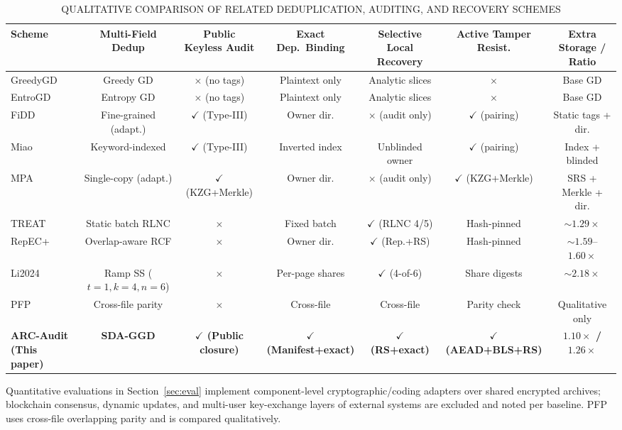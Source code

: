 \documentclass[10pt,journal]{IEEEtran}
\newcommand{\tabnote}[1]{\par\smallskip\parbox{\linewidth}{\footnotesize #1}}
\begin{document}
\begin{table}[t]\centering\scriptsize
\caption{QUALITATIVE COMPARISON OF RELATED DEDUPLICATION, AUDITING, AND RECOVERY SCHEMES}\label{tab:lit-compare}
\setlength{\tabcolsep}{2.8pt}
\begin{tabular}{@{}lcccccc@{}}\toprule
Scheme & Multi-Field Dedup & Public Keyless Audit & Exact Dep.\ Binding & Selective Local Recovery & Active Tamper Resist. & Extra Storage / Ratio\\\midrule
GreedyGD~\cite{Hurst2024GreedyGD} & Greedy GD & $\times$ (no tags) & Plaintext only & Analytic slices & $\times$ & Base GD\\
EntroGD~\cite{Zhao2026EntroGD} & Entropy GD & $\times$ (no tags) & Plaintext only & Analytic slices & $\times$ & Base GD\\
FiDD~\cite{Huang2026FiDD} & Fine-grained (adapt.) & $\checkmark$ (Type-III) & Owner dir. & $\times$ (audit only) & $\checkmark$ (pairing) & Static tags + dir.\\
Miao~\cite{Miao2025} & Keyword-indexed & $\checkmark$ (Type-III) & Inverted index & Unblinded owner & $\checkmark$ (pairing) & Index + blinded\\
MPA~\cite{Xu2026MPA} & Single-copy (adapt.) & $\checkmark$ (KZG+Merkle) & Owner dir. & $\times$ (audit only) & $\checkmark$ (KZG+Merkle) & SRS + Merkle + dir.\\
TREAT~\cite{Taurone2024TREAT} & Static batch RLNC & $\times$ & Fixed batch & $\checkmark$ (RLNC 4/5) & Hash-pinned & $\sim 1.29\times$\\
RepEC+~\cite{Zuo2022RepECPlus} & Overlap-aware RCF & $\times$ & Owner dir. & $\checkmark$ (Rep.+RS) & Hash-pinned & $\sim 1.59$--$1.60\times$\\
Li2024~\cite{Li2024TNSE} & Ramp SS ($t{=}1,k{=}4,n{=}6$) & $\times$ & Per-page shares & $\checkmark$ (4-of-6) & Share digests & $\sim 2.18\times$\\
PFP~\cite{Wu2019PFP} & Cross-file parity & $\times$ & Cross-file & Cross-file & Parity check & Qualitative only\\
\textbf{ARC-Audit (This paper)} & \textbf{SDA-GGD} & \textbf{$\checkmark$ (Public closure)} & \textbf{$\checkmark$ (Manifest+exact)} & \textbf{$\checkmark$ (RS+exact)} & \textbf{$\checkmark$ (AEAD+BLS+RS)} & \textbf{$1.10\times$ / $1.26\times$}\\\bottomrule
\end{tabular}
\tabnote{Quantitative evaluations in Section~\ref{sec:eval} implement component-level cryptographic/coding adapters over shared encrypted archives; blockchain consensus, dynamic updates, and multi-user key-exchange layers of external systems are excluded and noted per baseline. PFP uses cross-file overlapping parity and is compared qualitatively.}
\end{table}
\end{document}
